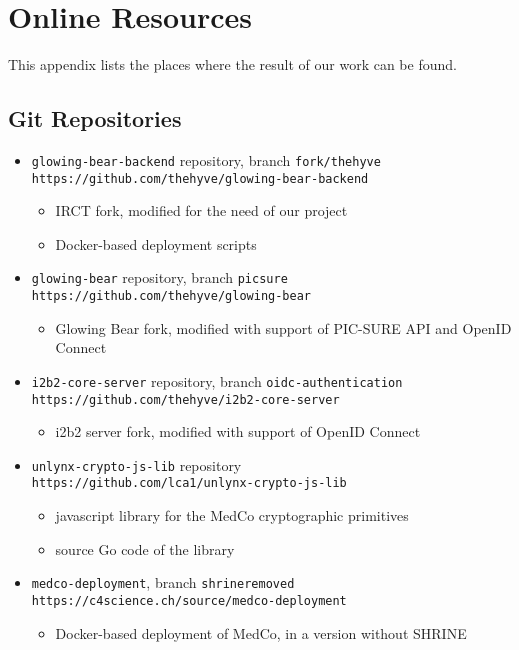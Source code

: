 \chapter{Online Resources}

This appendix lists the places where the result of our work can be found.

\section{Git Repositories}
\begin{itemize}
    \item \verb|glowing-bear-backend| repository, branch \verb|fork/thehyve| \\
    \verb|https://github.com/thehyve/glowing-bear-backend|
    \begin{itemize}
        \item IRCT fork, modified for the need of our project
        \item Docker-based deployment scripts
    \end{itemize}
    
    \item \verb|glowing-bear| repository, branch \verb|picsure| \\
    \verb|https://github.com/thehyve/glowing-bear|
    \begin{itemize}
        \item Glowing Bear fork, modified with support of PIC-SURE API and OpenID Connect
    \end{itemize}
    
    \item \verb|i2b2-core-server| repository, branch \verb|oidc-authentication| \\
    \verb|https://github.com/thehyve/i2b2-core-server|
    \begin{itemize}
        \item i2b2 server fork, modified with support of OpenID Connect
    \end{itemize}
    
    \item \verb|unlynx-crypto-js-lib| repository \\
    \verb|https://github.com/lca1/unlynx-crypto-js-lib|
    \begin{itemize}
        \item javascript library for the MedCo cryptographic primitives
        \item source Go code of the library
    \end{itemize}
    
    \item \verb|medco-deployment|, branch \verb|shrineremoved| \\
    \verb|https://c4science.ch/source/medco-deployment|
    \begin{itemize}
        \item Docker-based deployment of MedCo, in a version without SHRINE
    \end{itemize}
    
\end{itemize}

